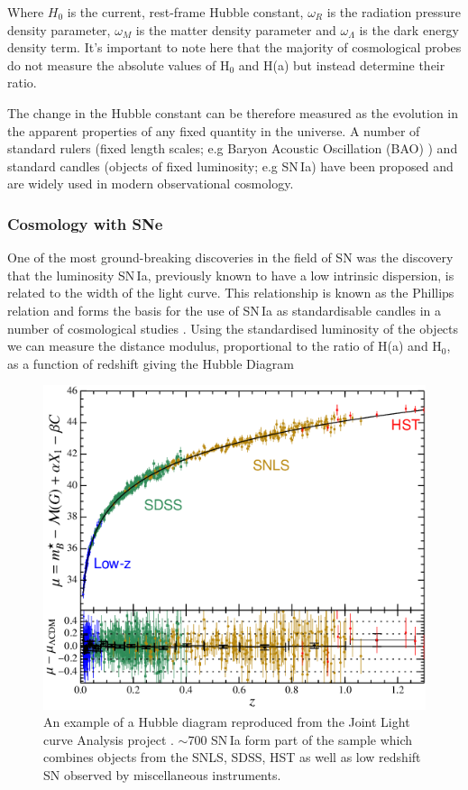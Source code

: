 \noindent Where $H_0$ is the current, rest-frame Hubble constant, $\omega_{R}$ is the radiation pressure density parameter, $\omega_{M}$ is the matter density parameter and $\omega_{\Lambda}$ is the dark energy density term. It's important to note here that the majority of cosmological probes do not measure the absolute values of H$_{0}$ and H(a) but instead determine their ratio.

The change in the Hubble constant can be therefore measured as the evolution in the apparent properties of any fixed quantity in the universe. A number of standard rulers (fixed length scales; e.g Baryon Acoustic Oscillation (BAO) \citep{Cole2005,Eisenstein2005}) and standard candles (objects of fixed luminosity; e.g SN\,Ia) have been proposed and are widely used in modern observational cosmology.

\subsubsection{Cosmology with SNe}
One of the most ground-breaking discoveries in the field of SN was the discovery that the luminosity SN\,Ia, previously known to have a low intrinsic dispersion, is related to the width of the light curve. This relationship is known as the Phillips relation \citep{Phillips1993} and forms the basis for the use of SN\,Ia as standardisable candles in a number of cosmological studies \citep{Perlmutter1999,Riess1998,Astier2005,Betoule2014}. Using the standardised luminosity of the objects we can measure the distance modulus, proportional to the ratio of H(a) and H$_0$, as a function of redshift giving the Hubble Diagram \citep[;][]{Betoule2014}

\begin{figure}
  \includegraphics[width=\textwidth]{Figures/Chapter1/Betoule14Hubble.png}
  \caption{An example of a Hubble diagram reproduced from the Joint Light curve Analysis project \citep{Betoule2014}. $\sim$700 SN\,Ia form part of the sample which combines objects from the SNLS, SDSS, HST as well as low redshift SN observed by miscellaneous instruments.}
  \label{fig:Betoule14Hubble}
\end{figure}

